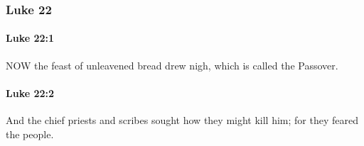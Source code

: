 	\subsubsection{Luke 22} %
		\label{LUKE-22}
		
		\paragraph{Luke 22:1} %
			\label{LUKE-22-1}

			NOW the feast of unleavened bread drew nigh, which is called the Passover.

			\begin{framed}
			\scriptsize
				\begin{compactdesc}
					\item[SBLG] 
				\end{compactdesc}
			\end{framed}

		\paragraph{Luke 22:2} %
			\label{LUKE-22-2}

			And the chief priests and scribes sought how they might kill him; for they feared the people.

